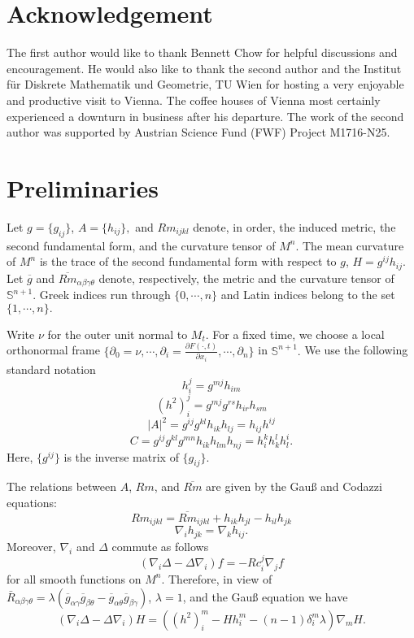 \documentclass{amsart}
\theoremstyle{definition}
\theoremstyle{remark}
\numberwithin{equation}{section}
\begin{document}
\section*{Acknowledgement}
The first author would like to thank Bennett Chow for helpful discussions and encouragement. He would also like to thank the second author and the Institut f\"ur Diskrete Mathematik und Geometrie, TU Wien for hosting a very enjoyable and productive visit to Vienna. The coffee houses of Vienna most certainly experienced a downturn in business after his departure. The work of the second author was supported by Austrian Science Fund (FWF) Project M1716-N25.

\section{Preliminaries}
Let $g=\{g_{ij}\}$, $A=\{h_{ij}\},$ and $Rm_{ijkl}$ denote, in order, the induced metric, the second fundamental form, and the curvature tensor of $M^n$. The mean curvature of $M^n$ is the trace of the second fundamental form with respect to $g$, $H=g^{ij}h_{ij}.$ Let $\overline{g}$ and $\overline{Rm}_{\alpha\beta\gamma\theta}$ denote, respectively, the metric and the curvature tensor of $\mathbb{S}^{n+1}$. Greek indices run through $\{0,\cdots,n\}$ and Latin indices belong to the set $\{1,\cdots,n\}.$

Write $\nu$ for the outer unit normal to $M_t.$ For a fixed time, we choose a local orthonormal frame $\{\partial_0=\nu,\cdots,\partial_i=\frac{\partial F(\cdot,t)}{\partial x_i},\cdots,\partial_n\}$ in $\mathbb{S}^{n+1}.$ We use the following standard notation
\[h_i^j=g^{mj}h_{im}\]
\[(h^2)_i^j=g^{mj}g^{rs}h_{ir}h_{sm}\]
\[|A|^2=g^{ij}g^{kl}h_{ik}h_{lj}=h_{ij}h^{ij}\]
\[C=g^{ij}g^{kl}g^{mn}h_{ik}h_{lm}h_{nj}=h_i^kh_k^lh_l^i.\]
Here, $\{g^{ij}\}$ is the inverse matrix of $\{g_{ij}\}.$

The relations between $A$, $Rm$, and $\overline{Rm}$ are given by the Gau{\ss} and Codazzi equations:
\[Rm_{ijkl}=\overline{Rm}_{ijkl}+h_{ik}h_{jl}-h_{il}h_{jk}\]
\[\nabla_ih_{jk}=\nabla_{k}h_{ij}.\]
Moreover, $\nabla_i$ and $\Delta$ commute as follows
\[(\nabla_i\Delta-\Delta\nabla_i)f=-Rc_i^j\nabla_jf\]
for all smooth functions on $M^n.$
Therefore, in view of $\bar{R}_{\alpha\beta\gamma\theta}=\lambda (\overline{g}_{\alpha\gamma}\overline{g}_{\beta\theta}-\overline{g}_{\alpha\theta}\overline{g}_{\beta\gamma})$, $\lambda =1$, and the Gau{\ss} equation we have
\begin{equation}\label{eq: commute}
(\nabla_i\Delta-\Delta\nabla_i)H=((h^2)_i^m-Hh_i^m-(n-1)\delta_i^m\lambda )\nabla_mH.
\end{equation}
\end{document}
